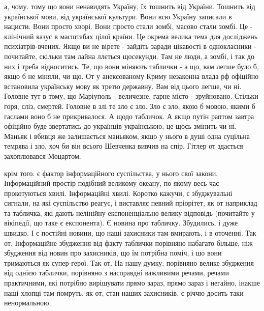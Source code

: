 а, чому. тому що вони ненавидять Україну, їх тошнить від України. Тошнить від
української мови, від української культури. Вони всю Україну записали в
нацисти. Вони просто хворі. Вони просто стали зомбі, масово стали зомбі. Це -
клінічний казус в масштабах цілої країни. Це окрема велика тема для досліджень
психіатрів-вчених. Якщо ви не вірете - зайдіть заради цікавості в однокласники
- почитайте, скільки там лайна ллється щосекунди. Там не люди, а зомбі, і так
до них і треба відноситись. Те, що вони міняють таблички - а що, вам легше було
б, якщо б не міняли, чи що. От у анексованому Криму незаконна влада рф офіційно
встановила українську мову як третю державну. Вам від цього легше, чи ні.
Головне тут в тому, що Маріуполь - величезне, гарне місто - зруйновано. Стільки
горя, сліз, смертей. Головне в злі те зло є зло. Зло є зло, якою б мовою, якими
б гаслами воно б не прикривалося. А щодо табличок. А якщо путін раптом завтра
офіційно буде звертатись до українців українською, це щось змінить чи ні.
Маньяк і вбивця же залишається маньяком, якщо у нього в душі одна суцільна
темрява і зло, хоч би він всього Шевченка вивчив на спір. Гітлер от здається
захоплювався Моцартом.

крім того. є фактор інформаційного суспільства, у нього свої закони.
Інформаційний простір подібний великому океану, по якому весь час прокотуються
хвилі. Інформаційні хвилі. Коротко кажучи, є збуджувальні сигнали, на які
суспільство реагує, і виставляє певний пріорітет, як от наприклад та табличка,
які дають нелінійну експоненціально велику відповідь (почитайте у вікіпедії, що
таке є експонента). Є новина про табличку. Збудились, і дуже швидко. І є
постійні новини, що наші захисники там вмирають, і в оточенні. Так от.
Інформаційне збудження від факту таблички порівняно набагато більше, ніж
збудження від новин про захисників, що їм потрібна поміч, і шо вони тримаються
як супер-герої. Так от. На нашу думку, порівняно велике збудження від однією
таблички, порівняно з насправдні важливими речами, речами практичними, які
потрібно вирішувати прямо зараз, прямо зараз і негайно, інакше наші хлопці там
помруть, як от, стан наших захисників, є річчю досить таки ненормальною.

